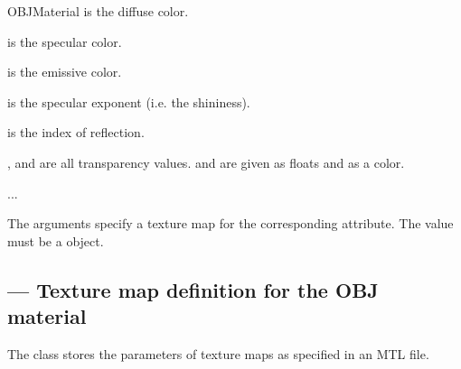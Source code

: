 \begin{classdesc}{OBJMaterial}
 is the diffuse color.

 is the specular color.

 is the emissive color.

 is the specular exponent (i.e. the shininess).

 is the index of reflection.

,  and  are all transparency values.  and
 are given as floats and  as a color.

...

The  arguments specify a texture map for the corresponding attribute.
The value must be a  object.

\end{classdesc}


\subsection{ --- Texture map definition for the OBJ material}

The  class stores the parameters of texture maps
as specified in an MTL file.

